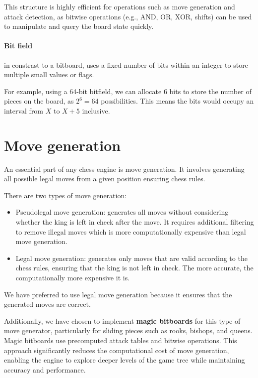 \noindent This structure is highly efficient for operations such as move generation and attack detection, as bitwise operations (e.g., AND, OR, XOR, shifts) can be used to manipulate and query the board state quickly.

\paragraph{Bit field} in constrast to a bitboard, uses a fixed number of bits within an integer to store multiple small values or flags.

\vspace{1em}

\noindent For example, using a 64-bit bitfield, we can allocate 6 bits to store the number of pieces on the board, as $2^6 = 64$ possibilities. This means the bits would occupy an interval from $X$ to $X+5$ inclusive.

\section{Move generation}
\label{sec:move-generation}

An essential part of any chess engine is move generation. It involves generating all possible legal moves from a given position ensuring chess rules.

\vspace{1em}

\noindent There are two types of move generation:

\begin{itemize}
    \item Pseudolegal move generation: generates all moves without considering whether the king is left in check after the move. It requires additional filtering to remove illegal moves which is more computationally expensive than legal move generation.
    \item Legal move generation: generates only moves that are valid according to the chess rules, ensuring that the king is not left in check. The more accurate, the computationally more expensive it is.
\end{itemize}

\noindent We have preferred to use legal move generation because it ensures that the generated moves are correct.

\vspace{1em}

\noindent Additionally, we have chosen to implement \textbf{magic bitboards} for this type of move generator, particularly for sliding pieces such as rooks, bishops, and queens. Magic bitboards use precomputed attack tables and bitwise operations. This approach significantly reduces the computational cost of move generation, enabling the engine to explore deeper levels of the game tree while maintaining accuracy and performance.

